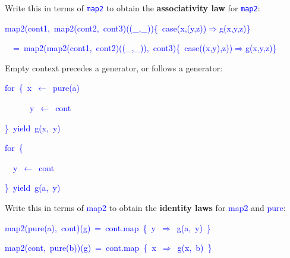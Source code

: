 Write this in terms of \texttt{\textcolor{blue}{\footnotesize{}map2}}
to obtain the \textbf{associativity law} for \texttt{\textcolor{blue}{\footnotesize{}map2}}:
\begin{lyxcode}
\vspace{-0.1cm}\textcolor{blue}{\footnotesize{}map2(cont1,~map2(cont2,~cont3)((\_,\_))\{~case(x,(y,z))$\Rightarrow$g(x,y,z)\}}{\footnotesize\par}
\begin{lyxcode}
\textcolor{blue}{\footnotesize{}~~=~map2(map2(cont1,~cont2)((\_,\_)),~cont3)\{~case((x,y),z))$\Rightarrow$g(x,y,z)\}}~
\end{lyxcode}
Empty context precedes a generator, or follows a generator:\textcolor{blue}{\footnotesize{}\smallskip{}
}{\footnotesize\par}

\textcolor{blue}{\footnotesize{}}%
\begin{minipage}[c][1\totalheight][t]{0.49\columnwidth}%
\begin{lyxcode}
\textcolor{blue}{\footnotesize{}for~\{~x~$\leftarrow$~pure(a)}{\footnotesize\par}

\textcolor{blue}{\footnotesize{}~~~~~~y~$\leftarrow$~cont}{\footnotesize\par}

\textcolor{blue}{\footnotesize{}\}~yield~g(x,~y)}{\footnotesize\par}
\end{lyxcode}
%
\end{minipage}\textcolor{blue}{\footnotesize{}\hfill{}}%
\begin{minipage}[c][1\totalheight][t]{0.49\columnwidth}%
\begin{lyxcode}
\textcolor{blue}{\footnotesize{}for~\{}{\footnotesize\par}

\textcolor{blue}{\footnotesize{}~~y~$\leftarrow$~cont}{\footnotesize\par}

\textcolor{blue}{\footnotesize{}\}~yield~g(a,~y)}{\footnotesize\par}
\end{lyxcode}
%
\end{minipage}\textcolor{blue}{\footnotesize{}\hfill{}\medskip{}
}{\footnotesize\par}

Write this in terms of \textcolor{blue}{\footnotesize{}map2} to obtain
the \textbf{identity laws} for \textcolor{blue}{\footnotesize{}map2}
and \textcolor{blue}{\footnotesize{}pure}:
\begin{lyxcode}
\vspace{-0.1cm}\textcolor{blue}{\footnotesize{}map2(pure(a),~cont)(g)~=~cont.map~\{~y~$\Rightarrow$~g(a,~y)~\}}~

\textcolor{blue}{\footnotesize{}map2(cont,~pure(b))(g)~=~cont.map~\{~x~$\Rightarrow$~g(x,~b)~\}}~
\end{lyxcode}
\end{lyxcode}


